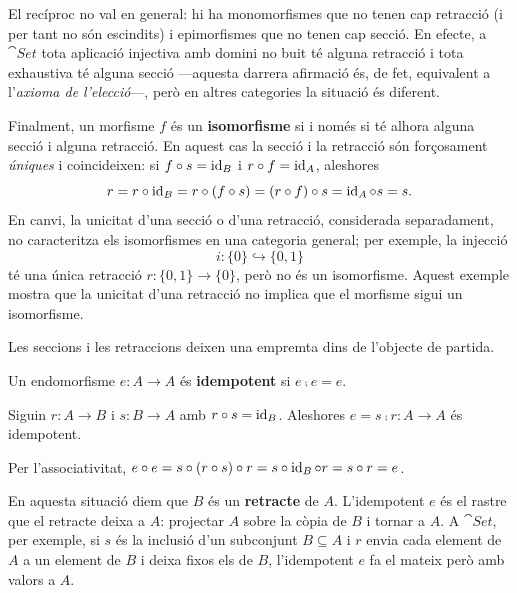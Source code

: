 \begin{observacio}
El recíproc no val en general: hi ha monomorfismes que no tenen cap retracció (i per tant no són escindits) i epimorfismes que no tenen cap secció. En efecte, a $\cat{Set}$ tota aplicació injectiva amb domini no buit té alguna retracció i tota exhaustiva té alguna secció ---aquesta darrera afirmació és, de fet, equivalent a l'\emph{axioma de l'elecció}---, però en altres categories la situació és diferent.

Finalment, un morfisme $f$ és un \textbf{isomorfisme} si i només si té alhora alguna secció i alguna retracció. En aquest cas la secció i la retracció són forçosament \emph{úniques} i coincideixen: si $f\circ s=\operatorname{id}_B$ i $r\circ f=\operatorname{id}_A$, aleshores
\[
r=r\circ\operatorname{id}_B=r\circ(f\circ s)=(r\circ f)\circ s=\operatorname{id}_A\circ s=s.
\]
En canvi, la unicitat d’una secció o d’una retracció, considerada
separadament, no caracteritza els isomorfismes en una categoria general; per exemple, la injecció
\[
 i\colon\{0\}\hookrightarrow\{0,1\}
\]
té una única retracció $r\colon\{0,1\}\to\{0\}$, però no és un isomorfisme. Aquest exemple mostra que la unicitat d'una retracció no implica que el morfisme sigui un isomorfisme.
\end{observacio}

Les seccions i les retraccions deixen una empremta dins de l'objecte de partida.

\begin{definicio}[Idempotent]\label{def:idempotent}
Un endomorfisme $e\colon A\to A$ és \textbf{idempotent} si $e\comp e=e$.
\end{definicio}

\begin{proposicio}\label{prop:retracte-idempotent}
Siguin $r\colon A\to B$ i $s\colon B\to A$ amb $r\circ s=\operatorname{id}_B$. Aleshores $e=s\comp r\colon A\to A$ és idempotent.
\end{proposicio}

\begin{prova}
Per l'associativitat, $e\circ e=s\circ(r\circ s)\circ r=s\circ\operatorname{id}_B\circ r=s\circ r=e$.
\end{prova}

En aquesta situació diem que $B$ és un \textbf{retracte} de $A$. L'idempotent $e$ és el rastre que el retracte deixa a $A$: projectar $A$ sobre la còpia de $B$ i tornar a $A$. A $\cat{Set}$, per exemple, si $s$ és la inclusió d'un subconjunt $B\subseteq A$ i $r$ envia cada element de $A$ a un element de $B$ i deixa fixos els de $B$, l'idempotent $e$ fa el mateix però amb valors a $A$.

